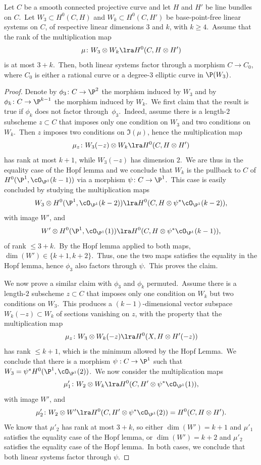 \begin{lemm}\label{lepourconcprop72}
Let $C$ be a smooth connected projective curve and let $H$ and $H'$ be  line bundles on $C$.\ Let
$W_3\subset H^0(C,H)$ and $W_k\subset H^0(C,H')$ be  base-point-free linear systems on $C$, of respective linear dimensions $3$ and $k$, with $k\geq 4$.\
Assume that the rank of the multiplication map
$$\mu\colon W_3\otimes W_k\lra H^0(C,H\otimes H')$$
is at most $3+k$.\ Then, both linear systems factor through a morphism $C\to C_0$, where $C_0$ is either a  rational curve or a degree-$3$ elliptic curve in $\P(W_3)$.
\end{lemm}

\begin{proof} Denote by $\phi_3\colon C\to \P^2$   the morphism  induced by $W_3$ and by
$\phi_k\colon C\to \P^{k-1}$ the morphism  induced by $W_k$.\   We first claim that the result is true if  $\phi_{k}$ does not factor through~$\phi_3$.\ Indeed, assume there is a length-$2$ subscheme
$z\subset C$ that imposes only one  condition on $W_3$ and two conditions on $W_k$.\ Then
$z$ imposes two conditions on $\Im(\mu)$, hence the multiplication map
$$\mu_z\colon W_3(-z)\otimes W_k\lra   H^0(C, H\otimes H')$$
has rank at most $k+1$, while $W_3(-z)$ has dimension $2$.\ We are thus in the  equality case of the Hopf lemma  and we conclude that $W_k$ is the pullback to $C$ of $H^0(\P^1,\cO_{\P^1}(k-1))$ via a morphism
$\psi\colon C\to  \P^1$.\ This case is easily concluded by studying  the
multiplication maps
$$W_3\otimes H^0(\P^1,\cO_{\P^1}(k-2))\lra H^0(C,H\otimes \psi^*\cO_{\P^1}(k-2)),$$
 with image $W'$, and
$$W'\otimes H^0(\P^1,\cO_{\P^1}(1))\lra H^0(C,H\otimes \psi^*\cO_{\P^1}(k-1)), $$
of rank $\leq 3+k$.\
By the Hopf lemma applied to both maps,   $\dim (W')\in\{k+1,k+2\}$.\ Thus, one the two maps  satisfies  the equality in the Hopf lemma, hence    $\phi_3$ also factors through $\psi$.\ This proves the  claim.

We now prove a similar claim with $\phi_3$ and $\phi_{k}$ permuted.\ Assume  there is a length-$2$ subscheme $z\subset C$ that imposes only one condition on $W_k$ but two conditions on $W_3$.\ This produces a $(k-1)$-dimensional vector subspace $W_{k}(-z)\subset W_k$ of sections vanishing on $z$, with the property that the multiplication map
$$\mu_z\colon W_3\otimes W_{k}(-z)\lra H^0(X,H\otimes  H'(-z))$$
has rank $\leq k+1$, which is the minimum allowed by the Hopf Lemma.\ We conclude that there is a morphism $\psi:C\rightarrow \P^1$ such that $W_3=\psi^*H^0(\P^1,\cO_{\P^1}(2))$.\
We now consider the   multiplication maps
$$\mu'_1\colon  W_2\otimes  W_k\lra H^0(C, H'\otimes \psi^* \cO_{\P^1}(1)),$$
with image $W'$, and
$$ \mu'_2\colon W_2\otimes  W'\lra H^0(C, H'\otimes \psi^* \cO_{\P^1}(2))=H^0(C,H\otimes H').$$
We know that  $\mu'_2$ has rank at most $3+k$, so either $\dim (W')=k+1$ and $\mu'_1$ satisfies  the equality case of  the Hopf lemma, or
$\dim (W')=k+2$ and  $\mu'_2$ satisfies  the equality case of  the Hopf lemma.\ In both cases, we conclude that both linear systems factor through $\psi$.


\end{proof}
